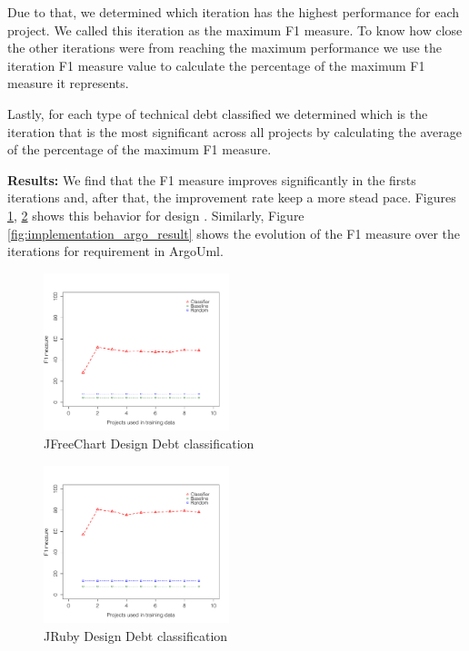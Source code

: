 Due to that, we determined which iteration has the highest performance for each project. We called this iteration as the maximum F1 measure. To know how close the other iterations were from reaching the maximum performance we use the iteration F1 measure value to calculate the percentage of the maximum F1 measure it represents.

Lastly, for each type of technical debt classified we determined which is the iteration that is the most significant across all projects by calculating the average of the percentage of the maximum F1 measure.

\vspace{1mm}
\noindent \textbf{Results:} We find that the F1 measure improves significantly in the firsts iterations and, after that, the improvement rate keep a more stead pace. Figures \ref{fig:design_jfreechart_result}, \ref{fig:design_jruby_result} shows this behavior for design \SATD. Similarly, Figure \ref{fig:implementation_argo_result} shows the evolution of the F1 measure over the iterations for requirement \SATD in ArgoUml. 

\begin{figure}[thb!]
   \centering
  \includegraphics[width=0.48\textwidth]{figures/design_jfreechart.pdf}
  \vspace{-3mm}
  \caption{JFreeChart Design Debt classification}
  \label{fig:design_jfreechart_result}
\end{figure}

\begin{figure}[thb!]
  \centering
  \includegraphics[width=0.48\textwidth]{figures/design_jruby.pdf}
  \vspace{-3mm}
  \caption{JRuby Design Debt classification}
  \label{fig:design_jruby_result}
\end{figure}

